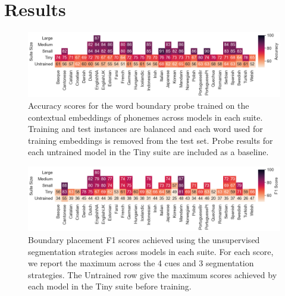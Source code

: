 \section{Results}


\begin{figure}[t]
    \centering
    \includegraphics[width=\linewidth]{Figures/15Segmentation/probe_results.png}
    \caption{Accuracy scores for the word boundary probe trained on the contextual embeddings of phonemes across models in each suite. Training and test instances are balanced and each word used for training embeddings is removed from the test set. Probe results for each untrained model in the Tiny suite are included as a baseline.}
    \label{fig:15-probes}
\end{figure}

\begin{figure}[t]
    \centering
    \includegraphics[width=\linewidth]{Figures/15Segmentation/unsupervised.png}
    \caption{Boundary placement F1 scores achieved using the unsupervised segmentation strategies across models in each suite. For each score, we report the maximum across the 4 cues and 3 segmentation strategies. The Untrained row give the maximum scores achieved by each model in the Tiny suite before training.}
    \label{fig:15-unsupervised}
\end{figure}

